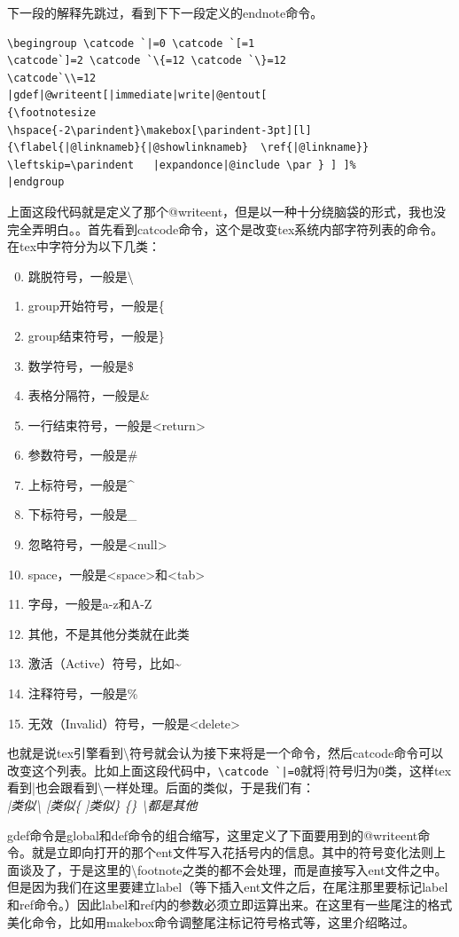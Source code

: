 \documentclass[12pt,oneside]{book}
\begin{document}
\begin{common-format}
下一段的解释先跳过，看到下下一段定义的endnote命令。
\begin{Verbatim}
\begingroup \catcode `|=0 \catcode `[=1
\catcode`]=2 \catcode `\{=12 \catcode `\}=12
\catcode`\\=12
|gdef|@writeent[|immediate|write|@entout[
{\footnotesize
\hspace{-2\parindent}\makebox[\parindent-3pt][l]
{\flabel{|@linknameb}{|@showlinknameb}  \ref{|@linkname}}
\leftskip=\parindent   |expandonce|@include \par } ] ]%
|endgroup
\end{Verbatim}
上面这段代码就是定义了那个@writeent，但是以一种十分绕脑袋的形式，我也没完全弄明白。。首先看到catcode命令，这个是改变tex系统内部字符列表的命令。在tex中字符分为以下几类：
\begin{enumerate}
\setcounter{enumi}{-1}
\item 跳脱符号，一般是\textbackslash
\item group开始符号，一般是\{
\item group结束符号，一般是\}
\item 数学符号，一般是\$
\item 表格分隔符，一般是\&
\item 一行结束符号，一般是<return>
\item 参数符号，一般是\#
\item 上标符号，一般是\^{}
\item 下标符号，一般是\_
\item 忽略符号，一般是<null>
\item space，一般是<space>和<tab>
\item 字母，一般是a-z和A-Z
\item 其他，不是其他分类就在此类
\item 激活（Active）符号，比如\~{}
\item 注释符号，一般是\%
\item 无效（Invalid）符号，一般是<delete>
\end{enumerate}
也就是说tex引擎看到\textbackslash 符号就会认为接下来将是一个命令，然后catcode命令可以改变这个列表。比如上面这段代码中，\verb+\catcode `|=0+就将|符号归为0类，这样tex看到|也会跟看到\textbackslash 一样处理。后面的类似，于是我们有：\\
\emph{|类似\textbackslash{  }   [类似\{  ]类似\}  \{\} \textbackslash 都是其他 }

gdef命令是global和def命令的组合缩写，这里定义了下面要用到的@writeent命令。就是立即向打开的那个ent文件写入花括号内的信息。其中的符号变化法则上面谈及了，于是这里的\textbackslash footnote之类的都不会处理，而是直接写入ent文件之中。但是因为我们在这里要建立label（等下插入ent文件之后，在尾注那里要标记label和ref命令。）因此label和ref内的参数必须立即运算出来。在这里有一些尾注的格式美化命令，比如用makebox命令调整尾注标记符号格式等，这里介绍略过。


\end{common-format}
\end{document}
